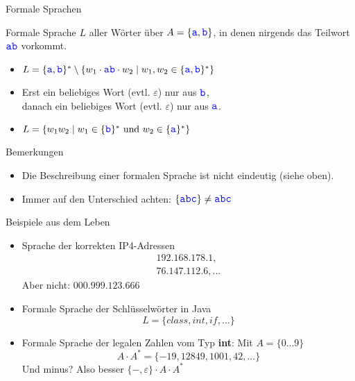 \begin{frame}{Formale Sprachen}
	
	\begin{Beispiel}
		Formale Sprache $L$ aller Wörter über $A=\{\literal{a},\literal{b}\}$, in denen nirgends das Teilwort $\literal{ab}$ vorkommt.
		\begin{itemize}
			\pause
			\item $L=\{\literal{a},\literal{b}\}^*
			\setminus \{w_1 \cdot \literal{ab} \cdot w_2 \mid w_1,w_2\in
			\{\literal{a},\literal{b}\}^*\}$
			
			\pause
			\item Erst ein beliebiges Wort (evtl. $\varepsilon$) nur aus $\literal{b}$,\\
			danach ein beliebiges Wort (evtl. $\varepsilon$) nur aus $\literal{a}$.
			
			\pause
			\item $L=\{w_1w_2 \mid w_1\in 
			\{\literal{b}\}^*  \text{ und }  w_2\in \{\literal{a}\}^* \}$
		\end{itemize}
	\end{Beispiel}

	\begin{block}{Bemerkungen}
		\begin{itemize}
			\pause
			\item Die Beschreibung einer formalen Sprache ist nicht eindeutig (siehe oben).
			\pause
			\item Immer auf den Unterschied achten: $\{\literal{abc} \} \neq \literal{abc} $
		\end{itemize}
	\end{block}
\end{frame}


\begin{frame}{Beispiele aus dem Leben}
	\begin{itemize}
		\item Sprache der korrekten IP4-Adressen \pause
		\begin{align*}
		192.168.178.1,\\
		76.147.112.6, ...
		\end{align*} 
		\pause Aber nicht: $000.999.123.666$ \pause
		\item Formale Sprache der Schlüsselwörter in Java $$L = \{ class, int , if, \dots \}$$ \pause
		\item Formale Sprache der legalen Zahlen vom Typ \textbf{int}: Mit $A = \{0...9\}$ 
		\pause $$A \cdot A^* = \{-19, 12849, 1001, 42, ...\}$$ 
		\pause Und minus? Also besser $ \{ -, \varepsilon \} \cdot A \cdot A^*$
	\end{itemize}
\end{frame}


